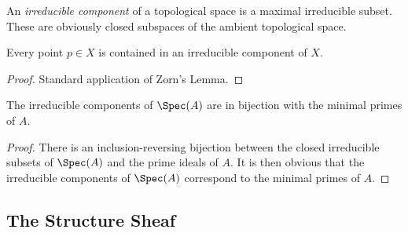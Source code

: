 \begin{definition}
    An \emph{irreducible component} of a topological space is a maximal irreducible subset. These are obviously closed subspaces of the ambient topological space.
\end{definition}

\begin{proposition}
    Every point $p\in X$ is contained in an irreducible component of $X$.
\end{proposition}
\begin{proof}
    Standard application of Zorn's Lemma.
\end{proof}

\begin{proposition}
    The irreducible components of $\Spec(A)$ are in bijection with the minimal primes of $A$.
\end{proposition}
\begin{proof}
    There is an inclusion-reversing bijection between the closed irreducible subsets of $\Spec(A)$ and the prime ideals of $A$. It is then obvious that the irreducible components of $\Spec(A)$ correspond to the minimal primes of $A$.
\end{proof}

\subsection{The Structure Sheaf}
